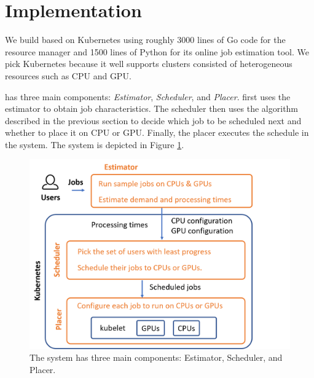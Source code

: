\section{{\name} Implementation}
\label{sec:system}



We build \name based on Kubernetes using roughly 3000 lines of Go code for the resource manager and 1500 lines of Python for its online job estimation tool.
We pick Kubernetes because it well supports clusters consisted of heterogeneous resources such as CPU and GPU.

\name has three main components: \emph{Estimator}, \emph{Scheduler}, and \emph{Placer}.
\name first uses the estimator to obtain job characteristics.%
The scheduler then uses the algorithm described in the previous section to decide which job to be scheduled next and whether to place it on CPU or GPU.
Finally, the placer executes the schedule in the system. %
The \name system is depicted in Figure \ref{fig:design}.

\begin{figure}
	\centering
	\includegraphics[width=1.0\linewidth]{figs/design}
	\caption{The \name system has three main components: Estimator, Scheduler, and Placer.}
	\label{fig:design}
\end{figure}

